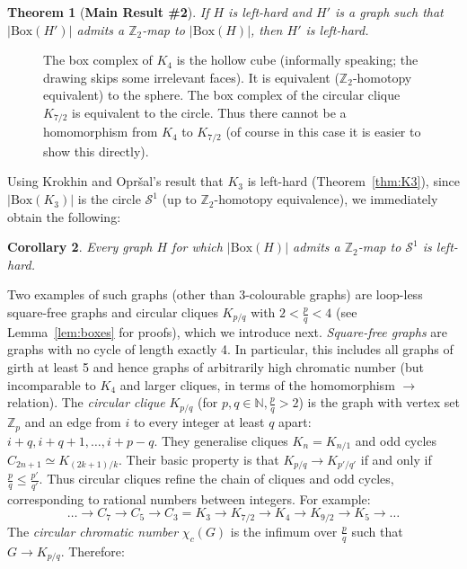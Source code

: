 \documentclass[11pt,a4paper]{scrartcl}
\newtheorem{theorem}{Theorem}
\numberwithin{theorem}{section}
\newtheorem{corollary}[theorem]{Corollary}
\theoremstyle{definition}
\newcommand{\ZZ}{\mathbb{Z}}
\newcommand{\NN}{\mathbb{N}}
\newcommand\Sphere{\mathcal{S}}
\newcommand\BBox[1]{\left|\mathrm{Box}(#1)\right|}
\begin{document}
\begin{theorem}[\textbf{Main Result \#2}]\label{thm:topoMain}
	If $H$ is left-hard and $H'$ is a graph such that $\BBox{H'}$ admits a $\ZZ_{2}$-map to $\BBox{H}$, then $H'$ is left-hard.
\end{theorem}

\begin{figure}[t!]
	\centering
	\makebox[\textwidth][c]{
		
	}
	\caption{The box complex of $K_4$ is the hollow cube (informally speaking; the drawing skips some irrelevant faces). It is equivalent ($\ZZ_2$-homotopy equivalent) to the sphere.
		The box complex of the circular clique $K_{7/2}$ is equivalent to the circle.
		Thus there cannot be a homomorphism from $K_4$ to $K_{7/2}$ (of course in this case it is easier to show this directly).}
	\label{fig:box}
\end{figure}

Using Krokhin and Opr\v{s}al's result that $K_3$ is left-hard (Theorem~\ref{thm:K3}), since $\BBox{K_3}$ is the circle $\Sphere^1$ (up to $\ZZ_2$-homotopy equivalence), we immediately obtain the following:
\begin{corollary}\label{cor:S1}
	Every graph $H$ for which $\BBox{H}$ admits a $\ZZ_2$-map to $\mathcal{S}^1$ is left-hard.
\end{corollary}

Two examples of such graphs (other than 3-colourable graphs) are loop-less square-free graphs and circular cliques $K_{p/q}$ with $2<\frac{p}{q}<4$ (see Lemma~\ref{lem:boxes} for proofs), which we introduce next.
\emph{Square-free graphs} are graphs with no cycle of length exactly 4.
In particular, this includes all graphs of girth at least 5 and hence graphs of arbitrarily high chromatic number (but incomparable to $K_4$ and larger cliques, in terms of the homomorphism $\to$ relation).
The \emph{circular clique} $K_{p/q}$ (for $p,q\in \NN, \frac{p}{q}>2$) is the graph with vertex set $\ZZ_p$ and an edge from $i$ to every integer at least $q$ apart: $i+q, i+q+1, \dots, i+p-q$.
They generalise cliques $K_n = K_{n/1}$ and odd cycles $C_{2n+1} \simeq K_{(2k+1)/k}$.
Their basic property is that $K_{p/q} \to K_{p'/q'}$ if and only if $\frac{p}{q} \leq \frac{p'}{q'}$.
Thus circular cliques refine the chain of cliques and odd cycles, corresponding to rational numbers between integers.
For example:
$$ \dots \to C_7 \to C_5 \to C_3 = K_3 \to K_{7/2} \to K_4 \to K_{9/2} \to K_5 \to \dots $$
The \emph{circular chromatic number} $\chi_c(G)$ is the infimum over $\frac{p}{q}$ such that $G \to K_{p/q}$.
Therefore:
\end{document}
